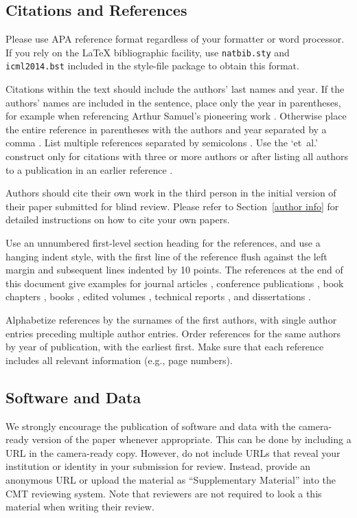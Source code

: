 \documentclass{article}
\begin{document}
\subsection{Citations and References} 

Please use APA reference format regardless of your formatter
or word processor. If you rely on the \LaTeX\/ bibliographic 
facility, use {\tt natbib.sty} and {\tt icml2014.bst} 
included in the style-file package to obtain this format.

Citations within the text should include the authors' last names and
year. If the authors' names are included in the sentence, place only
the year in parentheses, for example when referencing Arthur Samuel's
pioneering work . Otherwise place the entire
reference in parentheses with the authors and year separated by a
comma \cite{Samuel59}. List multiple references separated by
semicolons \cite{kearns89,Samuel59,mitchell80}. Use the `et~al.'
construct only for citations with three or more authors or after
listing all authors to a publication in an earlier reference \cite{MachineLearningI}.

Authors should cite their own work in the third person
in the initial version of their paper submitted for blind review.
Please refer to Section~\ref{author info} for detailed instructions on how to
cite your own papers.

Use an unnumbered first-level section heading for the references, and 
use a hanging indent style, with the first line of the reference flush
against the left margin and subsequent lines indented by 10 points. 
The references at the end of this document give examples for journal
articles \cite{Samuel59}, conference publications \cite{langley00}, book chapters \cite{Newell81}, books \cite{DudaHart2nd}, edited volumes \cite{MachineLearningI}, 
technical reports \cite{mitchell80}, and dissertations \cite{kearns89}. 

Alphabetize references by the surnames of the first authors, with
single author entries preceding multiple author entries. Order
references for the same authors by year of publication, with the
earliest first. Make sure that each reference includes all relevant
information (e.g., page numbers).

\subsection{Software and Data}

We strongly encourage the publication of software and data with the
camera-ready version of the paper whenever appropriate.  This can be
done by including a URL in the camera-ready copy.  However, do not
include URLs that reveal your institution or identity in your
submission for review.  Instead, provide an anonymous URL or upload
the material as ``Supplementary Material'' into the CMT reviewing
system.  Note that reviewers are not required to look a this material
when writing their review.
\end{document}
